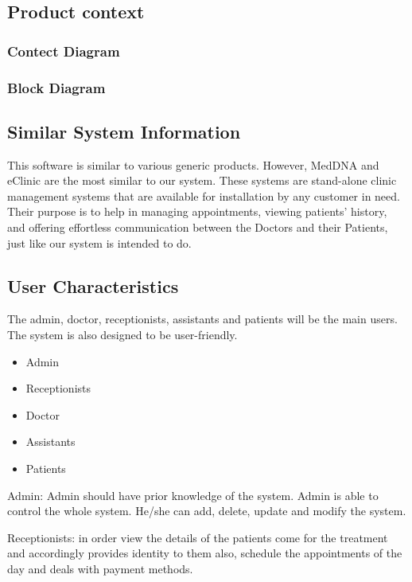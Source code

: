 \documentclass[]{article}
\begin{document}
\subsection{Product context}
\subsubsection{Contect Diagram}

\subsubsection{Block Diagram}


\subsection{Similar System Information}
This software is similar to various generic products. However, MedDNA and eClinic are the most similar to our system. These systems are stand-alone clinic management systems that are available for installation by any customer in need. Their purpose is to help in managing appointments, viewing patients' history, and offering effortless communication between the Doctors and their Patients, just like our system is intended to do.


\subsection{ User Characteristics}
The admin, doctor, receptionists, assistants and patients will be the main users. The system is also designed to be user-friendly. 

\begin{itemize}
  \item Admin
  \item Receptionists
  \item Doctor
  \item Assistants
  \item Patients
  
  
\end{itemize}

Admin: Admin should have prior knowledge of the system. Admin is able to control the whole system. He/she can add, delete, update and modify the system.


Receptionists: in order view the details of the patients come for the treatment and accordingly provides identity to them also, schedule the appointments of the day and deals with payment methods. 
\end{document}
